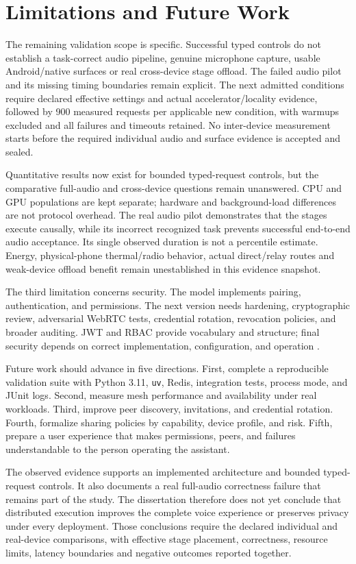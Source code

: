 \section{Limitations and Future Work}
\label{sec:limitations-future-work}

The remaining validation scope is specific. Successful typed controls do not establish a task-correct audio pipeline, genuine microphone capture, usable Android/native surfaces or real cross-device stage offload. The failed audio pilot and its missing timing boundaries remain explicit. The next admitted conditions require declared effective settings and actual accelerator/locality evidence, followed by 900 measured requests per applicable new condition, with warmups excluded and all failures and timeouts retained. No inter-device measurement starts before the required individual audio and surface evidence is accepted and sealed.

Quantitative results now exist for bounded typed-request controls, but the comparative full-audio and cross-device questions remain unanswered. CPU and GPU populations are kept separate; hardware and background-load differences are not protocol overhead. The real audio pilot demonstrates that the stages execute causally, while its incorrect recognized task prevents successful end-to-end audio acceptance. Its single observed duration is not a percentile estimate. Energy, physical-phone thermal/radio behavior, actual direct/relay routes and weak-device offload benefit remain unestablished in this evidence snapshot.

The third limitation concerns security. The model implements pairing, authentication, and permissions. The next version needs hardening, cryptographic review, adversarial WebRTC tests, credential rotation, revocation policies, and broader auditing. JWT and RBAC provide vocabulary and structure; final security depends on correct implementation, configuration, and operation \cite{rfc7519_jwt,rfc8725_jwt_bcp}.

Future work should advance in five directions. First, complete a reproducible validation suite with Python 3.11, \texttt{uv}, Redis, integration tests, process mode, and JUnit logs. Second, measure mesh performance and availability under real workloads. Third, improve peer discovery, invitations, and credential rotation. Fourth, formalize sharing policies by capability, device profile, and risk. Fifth, prepare a user experience that makes permissions, peers, and failures understandable to the person operating the assistant.

The observed evidence supports an implemented architecture and bounded typed-request controls. It also documents a real full-audio correctness failure that remains part of the study. The dissertation therefore does not yet conclude that distributed execution improves the complete voice experience or preserves privacy under every deployment. Those conclusions require the declared individual and real-device comparisons, with effective stage placement, correctness, resource limits, latency boundaries and negative outcomes reported together.